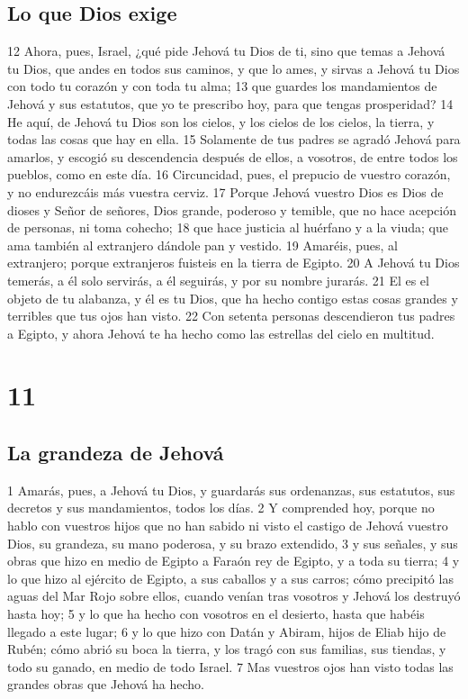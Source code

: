 \section{Lo que Dios exige}

12 Ahora, pues, Israel, ¿qué pide Jehová tu Dios de ti, sino que temas a Jehová tu Dios, que andes en todos sus caminos, y que lo ames, y sirvas a Jehová tu Dios con todo tu corazón y con toda tu alma;
13 que guardes los mandamientos de Jehová y sus estatutos, que yo te prescribo hoy, para que tengas prosperidad?
14 He aquí, de Jehová tu Dios son los cielos, y los cielos de los cielos, la tierra, y todas las cosas que hay en ella.
15 Solamente de tus padres se agradó Jehová para amarlos, y escogió su descendencia después de ellos, a vosotros, de entre todos los pueblos, como en este día.
16 Circuncidad, pues, el prepucio de vuestro corazón, y no endurezcáis más vuestra cerviz.
17 Porque Jehová vuestro Dios es Dios de dioses y Señor de señores, Dios grande, poderoso y temible, que no hace acepción de personas, ni toma cohecho;
18 que hace justicia al huérfano y a la viuda; que ama también al extranjero dándole pan y vestido.
19 Amaréis, pues, al extranjero; porque extranjeros fuisteis en la tierra de Egipto.
20 A Jehová tu Dios temerás, a él solo servirás, a él seguirás, y por su nombre jurarás.
21 El es el objeto de tu alabanza, y él es tu Dios, que ha hecho contigo estas cosas grandes y terribles que tus ojos han visto.
22 Con setenta personas descendieron tus padres a Egipto, y ahora Jehová te ha hecho como las estrellas del cielo en multitud.

\chapter{11}


\section{La grandeza de Jehová}


1 Amarás, pues, a Jehová tu Dios, y guardarás sus ordenanzas, sus estatutos, sus decretos y sus mandamientos, todos los días.
2 Y comprended hoy, porque no hablo con vuestros hijos que no han sabido ni visto el castigo de Jehová vuestro Dios, su grandeza, su mano poderosa, y su brazo extendido,
3 y sus señales, y sus obras que hizo en medio de Egipto a Faraón rey de Egipto, y a toda su tierra;
4 y lo que hizo al ejército de Egipto, a sus caballos y a sus carros; cómo precipitó las aguas del Mar Rojo sobre ellos, cuando venían tras vosotros y Jehová los destruyó hasta hoy;
5 y lo que ha hecho con vosotros en el desierto, hasta que habéis llegado a este lugar;
6 y lo que hizo con Datán y Abiram, hijos de Eliab hijo de Rubén; cómo abrió su boca la tierra, y los tragó con sus familias, sus tiendas, y todo su ganado, en medio de todo Israel.
7 Mas vuestros ojos han visto todas las grandes obras que Jehová ha hecho.


